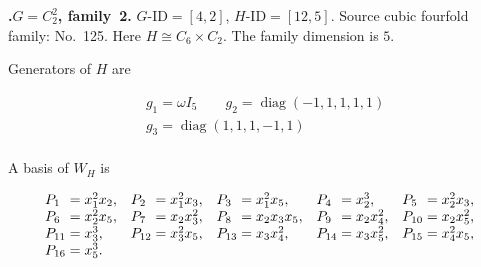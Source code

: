 \documentclass[12pt]{amsart}
\makeatletter
\numberwithin{equation}{section}
\theoremstyle{plain}
\theoremstyle{definition}
\theoremstyle{remark}
\DeclareMathOperator{\diag}{diag}
\newcommand{\PBasisLabel}[1]{\mathrlap{P_{#1}}\phantom{P_{99}}}
\newenvironment{SecEightAlignedBasis}[1]{%
  \begingroup\renewcommand{\arraystretch}{1.18}%
  \[\begin{array}{@{}#1@{}}%
}{\end{array}\]\endgroup}
\newenvironment{familydisplay}{%
  \begingroup
  \setlength{\arraycolsep}{1.35pt}%
  \renewcommand{\arraystretch}{0.96}%
  \setlength{\jot}{2pt}%
}{\endgroup}
\makeatother
\begin{document}
\par{}\medskip\noindent\textbf{.\enspace $G=C_2^2$, family~2.}\label{fam:threefold-no-32}
$G\text{-ID}=[4,2]$, $H\text{-ID}=[12,5]$.
Source cubic fourfold family: No.~125.  Here
$H\cong C_6\times C_2$.
The family dimension is $5$.
\par\smallskip\noindent Generators of $H$ are\par\nopagebreak
\begin{familydisplay}
\begin{align*}
&g_{1}=\omega I_5
\qquad g_{2}=\diag(-1,1,1,1,1)\\
&g_{3}=\diag(1,1,1,-1,1)\\
\end{align*}
\end{familydisplay}
\par\smallskip\noindent A basis of $W_H$ is\par\nopagebreak
\begin{familydisplay}
\begin{SecEightAlignedBasis}{l@{\quad}l@{\quad}l@{\quad}l@{\quad}l}
\PBasisLabel{1}=x_{1}^{2}x_{2}, & \PBasisLabel{2}=x_{1}^{2}x_{3}, & \PBasisLabel{3}=x_{1}^{2}x_{5}, & \PBasisLabel{4}=x_{2}^{3}, & \PBasisLabel{5}=x_{2}^{2}x_{3},\\
\PBasisLabel{6}=x_{2}^{2}x_{5}, & \PBasisLabel{7}=x_{2}x_{3}^{2}, & \PBasisLabel{8}=x_{2}x_{3}x_{5}, & \PBasisLabel{9}=x_{2}x_{4}^{2}, & \PBasisLabel{10}=x_{2}x_{5}^{2},\\
\PBasisLabel{11}=x_{3}^{3}, & \PBasisLabel{12}=x_{3}^{2}x_{5}, & \PBasisLabel{13}=x_{3}x_{4}^{2}, & \PBasisLabel{14}=x_{3}x_{5}^{2}, & \PBasisLabel{15}=x_{4}^{2}x_{5},\\
\multicolumn{5}{@{}l@{}}{\PBasisLabel{16}=x_{5}^{3}.}
\end{SecEightAlignedBasis}
\end{familydisplay}
\end{document}

